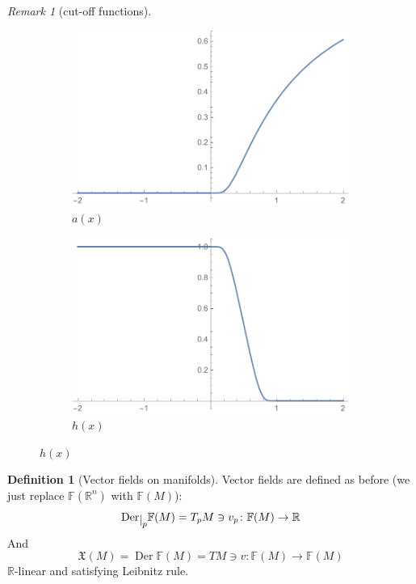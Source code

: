 \documentclass[a4paper,11pt,titlepage]{article}
\numberwithin{equation}{section}
\theoremstyle{definition}
\newtheorem{definition}[theorem]{Definition}
\theoremstyle{remark}
\newtheorem{remark}[theorem]{Remark}
\DeclareMathOperator{\Der}{Der}
\newcommand{\rfield}{\mathbb{R}}
\newcommand{\restrict}[2]{{#1}\raisebox{-.5ex}{$|$}_{#2}}
\begin{document}
\begin{remark}[cut-off functions]
  \begin{figure}
  \centering
  \begin{subfigure}{.5\textwidth}
    \centering
    \includegraphics[width=.9\linewidth]{Images/cutoff_1.pdf}
    \caption{$a(x)$}
  \end{subfigure}%
  \begin{subfigure}{.5\textwidth}
    \centering
    \includegraphics[width=.9\linewidth]{Images/cutoff_2}
    \caption{$h(x)$}
  \end{subfigure}
  \end{figure}
\end{remark}

\begin{definition}[Vector fields on manifolds]
  Vector fields are defined as before (we just replace $\mathbb{F}(\rfield^n)$ with $\mathbb{F}(M)$):
  $$\restrict{\Der}{p} \mathbb{F}(M) = T_p M \ni v_p \colon \mathbb{F}(M) \rightarrow \rfield$$
  And
  $$\mathfrak{X}(M) = \Der \mathbb{F}(M) = TM \ni v \colon \mathbb{F}(M) \rightarrow \mathbb{F}(M)$$
  $\rfield$-linear and satisfying Leibnitz rule.
\end{definition}
\end{document}
